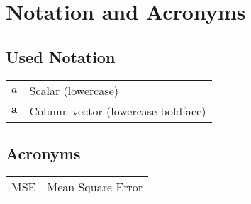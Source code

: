 \chapter*{Notation and Acronyms} 

\section*{Used Notation}

\indent

\begin{tabular}{p{3cm}l}
$a$ & Scalar (lowercase)\\
$\bf{a}$ & Column vector (lowercase boldface)\\
\end{tabular}

\section*{Acronyms}

\indent

\begin{tabular}{p{3cm}l}
MSE & Mean Square Error\\
\end{tabular}
